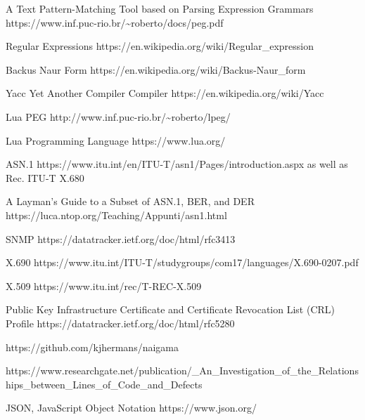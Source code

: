 \begin{thebibliography}{12}

  A Text Pattern-Matching Tool based on Parsing Expression Grammars
  https://www.inf.puc-rio.br/\~{}roberto/docs/peg.pdf

  Regular Expressions
  https://en.wikipedia.org/wiki/Regular\_expression

  Backus Naur Form
  https://en.wikipedia.org/wiki/Backus-Naur\_form

  Yacc Yet Another Compiler Compiler
  https://en.wikipedia.org/wiki/Yacc

  Lua PEG
  http://www.inf.puc-rio.br/\textasciitilde roberto/lpeg/

  Lua Programming Language
  https://www.lua.org/

  ASN.1
  https://www.itu.int/en/ITU-T/asn1/Pages/introduction.aspx
  as well as Rec. ITU-T X.680

  A Layman's Guide to a Subset of ASN.1, BER, and DER
  https://luca.ntop.org/Teaching/Appunti/asn1.html

  SNMP
  https://datatracker.ietf.org/doc/html/rfc3413

  X.690
  https://www.itu.int/ITU-T/studygroups/com17/languages/X.690-0207.pdf

  X.509
  https://www.itu.int/rec/T-REC-X.509

  Public Key Infrastructure Certificate
             and Certificate Revocation List (CRL) Profile
  https://datatracker.ietf.org/doc/html/rfc5280

  https://github.com/kjhermans/naigama

  https://www.researchgate.net/publication/\_An\_Investigation\_of\_the\_Relationships\_between\_Lines\_of\_Code\_and\_Defects

  JSON, JavaScript Object Notation
  https://www.json.org/

\end{thebibliography}
